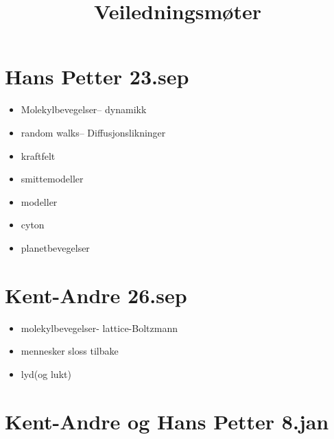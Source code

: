 \documentclass[norsk,11pt,a4paper]{article}
\begin{document}
\title{Veiledningsmøter}
\maketitle

\section*{Hans Petter 23.sep}

\begin{itemize}

  \item Molekylbevegelser-- dynamikk
  \item random walks-- Diffusjonslikninger
  \item kraftfelt
  \item smittemodeller
  \item modeller
  \item cyton
  \item planetbevegelser

\end{itemize}

\section*{Kent-Andre 26.sep}

\begin{itemize}
  \item molekylbevegelser- lattice-Boltzmann
  \item mennesker sloss tilbake
  \item lyd(og lukt)
\end{itemize}


\section*{Kent-Andre og Hans Petter 8.jan}
\end{document}
